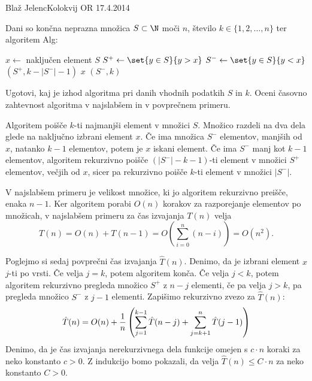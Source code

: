 \begin{naloga}{Blaž Jelenc}{Kolokvij OR 17.4.2014}
\begin{vprasanje}
Dani so končna neprazna množica $S \subset \N$ moči $n$,
število $k \in \{1, 2, \dots, n\}$ ter algoritem {\sc Alg}:
\begin{small}
\begin{algorithmic}
    \State $x \gets$ naključen element $S$
    \State $S^+ \gets \set{y \in S}{y > x}$
    \State $S^- \gets \set{y \in S}{y < x}$
        \State {}$(S^+, k - |S^-| - 1)$
        \State \Return $x$
    \Else
        \State {}$(S^-, k)$
    \EndIf
\EndFunction
\end{algorithmic}
\end{small}
Ugotovi, kaj je izhod algoritma pri danih vhodnih podatkih $S$ in $k$.
Oceni časovno zahtevnost algoritma v najslabšem in v povprečnem primeru.
\end{vprasanje}

\begin{odgovor}
Algoritem poišče $k$-ti najmanjši element v množici $S$.
Množico razdeli na dva dela glede na naključno izbrani element $x$.
Če ima množica $S^-$ elementov, manjših od $x$, natanko $k-1$ elementov,
potem je $x$ iskani element.
Če ima $S^-$ manj kot $k-1$ elementov,
algoritem rekurzivno poišče $(|S^-| - k - 1)$-ti element
v množici $S^+$ elementov, večjih od $x$,
sicer pa rekurzivno poišče $k$-ti element v množici $|S^-|$.

V najslabšem primeru je velikost množice,
ki jo algoritem rekurzivno preišče, enaka $n - 1$.
Ker algoritem porabi $O(n)$ korakov za razporejanje elementov po množicah,
v najslabšem primeru za čas izvajanja $T(n)$ velja
$$
T(n) = O(n) + T(n-1) = O\left(\sum_{i=0}^n (n-i)\right) = O(n^2).
$$

Poglejmo si sedaj povprečni čas izvajanja $\hat{T}(n)$.
Denimo, da je izbrani element $x$ $j$-ti po vrsti.
Če velja $j = k$, potem algoritem konča.
Če velja $j < k$, potem algoritem rekurzivno pregleda
množico $S^+$ z $n-j$ elementi,
če pa velja $j > k$, pa pregleda množico $S^-$ z $j-1$ elementi.
Zapišimo rekurzivno zvezo za $\hat{T}(n)$:
$$
\hat{T}(n) = O(n) +
{1 \over n} \left(\sum_{j=1}^{k-1} \hat{T}(n-j) +
\sum_{j=k+1}^n \hat{T}(j-1) \right)
$$
Denimo, da je čas izvajanja nerekurzivnega dela funkcije
omejen s $c \cdot n$ koraki za neko konstanto $c > 0$.
Z indukcijo bomo pokazali,
da velja $\hat{T}(n) \le C \cdot n$ za neko konstanto $C > 0$.


\end{odgovor}
\end{naloga}
